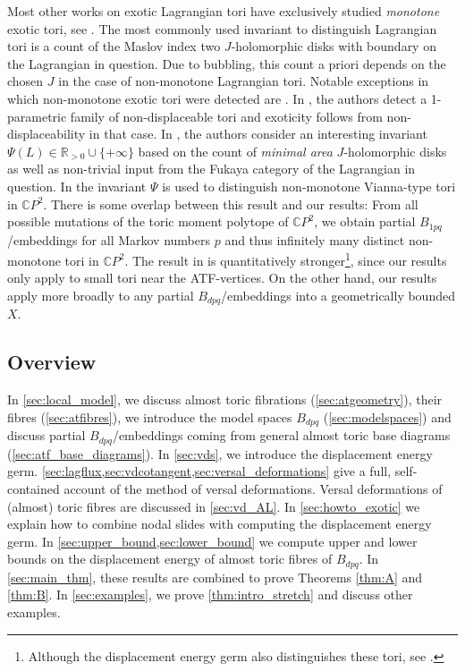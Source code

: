 \documentclass[12pt,a4paper,abstract=true,final]{scrartcl}
\begin{document}
Most other works on exotic Lagrangian tori have exclusively studied \emph{monotone} exotic tori, see \cite{Aur15, Che96, CheSch10, EliPol97, GalMik22, Via17, Via16}.
The most commonly used invariant to distinguish Lagrangian tori is a count of the Maslov index two $J$-holomorphic disks with boundary on the Lagrangian in question.
Due to bubbling, this count a priori depends on the chosen $J$ in the case of non-monotone Lagrangian tori.
Notable exceptions in which non-monotone exotic tori were detected are \cite{FOOO12, SheTonVia19}.
In \cite{FOOO12}, the authors detect a 1-parametric family of non-displaceable tori and exoticity follows from non-displaceability in that case.
In \cite{SheTonVia19}, the authors consider an interesting invariant $\Psi(L) \in \mathbb{R}_{>0} \cup \{+\infty\}$ based on the count of \emph{minimal area} $J$-holomorphic disks as well as non-trivial input from the Fukaya category of the Lagrangian in question.
In \cite[Section 7]{SheTonVia19} the invariant $\Psi$ is used to distinguish non-monotone Vianna-type tori in $\mathbb{C}P^2$.
There is some overlap between this result and our results:
From all possible mutations of the toric moment polytope of $\mathbb{C}P^2$, we obtain partial $B_{1pq}$\-/embeddings for all Markov numbers $p$ and thus infinitely many distinct non-monotone tori in $\mathbb{C}P^2$.
The result in \cite[Section 7]{SheTonVia19} is quantitatively stronger\footnote{Although the displacement energy germ also distinguishes these tori, see \cite[Example 3.7]{brendel2023local}.}, since our results only apply to small tori near the ATF-vertices.
On the other hand, our results apply more broadly to any partial $B_{dpq}$\-/embeddings into a geometrically bounded $X$.

\subsection{Overview}

In \cref{sec:local_model}, we discuss almost toric fibrations (\cref{sec:atgeometry}), their fibres (\cref{sec:atfibres}), we introduce the model spaces $B_{dpq}$ (\cref{sec:modelspaces}) and discuss partial $B_{dpq}$\-/embeddings coming from general almost toric base diagrams (\cref{sec:atf_base_diagrams}).
In \cref{sec:vds}, we introduce the displacement energy germ.
\cref{sec:lagflux,sec:vdcotangent,sec:versal_deformations} give a full, self-contained account of the method of versal deformations.
Versal deformations of (almost) toric fibres are discussed in \cref{sec:vd_AL}. In \cref{sec:howto_exotic} we explain how to combine nodal slides with computing the displacement energy germ.
In \cref{sec:upper_bound,sec:lower_bound} we compute upper and lower bounds on the displacement energy of almost toric fibres of $B_{dpq}$.
In \cref{sec:main_thm}, these results are combined to prove Theorems \ref{thm:A} and \ref{thm:B}.
In \cref{sec:examples}, we prove \cref{thm:intro_stretch} and discuss other examples.
\end{document}
